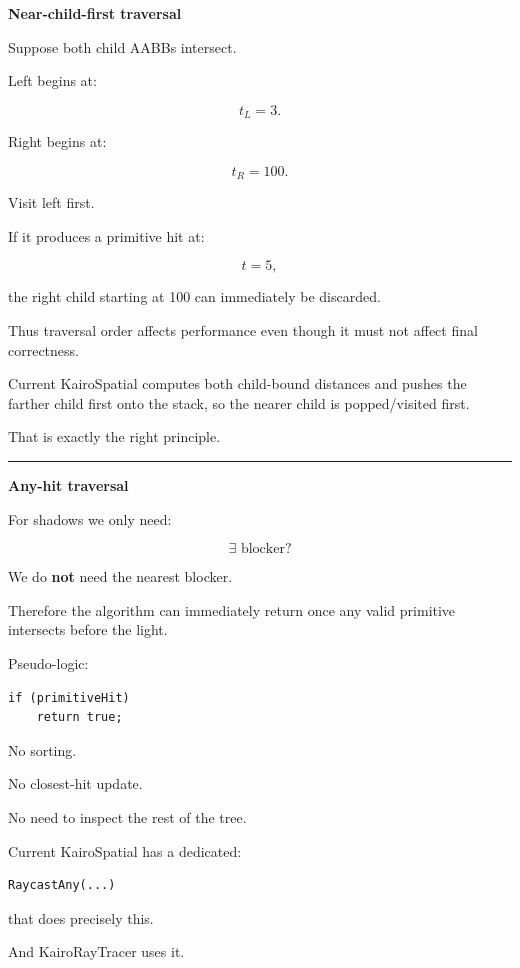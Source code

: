 \textbf{Near-child-first traversal}

Suppose both child AABBs intersect.

Left begins at:

\[
t_L=3.
\]

Right begins at:

\[
t_R=100.
\]

Visit left first.

If it produces a primitive hit at:

\[
t=5,
\]

the right child starting at 100 can immediately be discarded.

Thus traversal order affects performance even though it must not affect final correctness.

Current KairoSpatial  computes both child-bound distances and pushes the farther child first onto the stack, so the nearer child is popped/visited first.

That is exactly the right principle.

\begin{center}\rule{0.5\linewidth}{0.5pt}\end{center}

\textbf{Any-hit traversal}

For shadows we only need:

\[
\boxed{
\exists\text{ blocker?}
}
\]

We do \textbf{not} need the nearest blocker.

Therefore the algorithm can immediately return once any valid primitive intersects before the light.

Pseudo-logic:

\begin{verbatim}
if (primitiveHit)
    return true;
\end{verbatim}

No sorting.

No closest-hit update.

No need to inspect the rest of the tree.

Current KairoSpatial has a dedicated:

\begin{verbatim}
RaycastAny(...)
\end{verbatim}

that does precisely this.

And KairoRayTracer  uses it.

